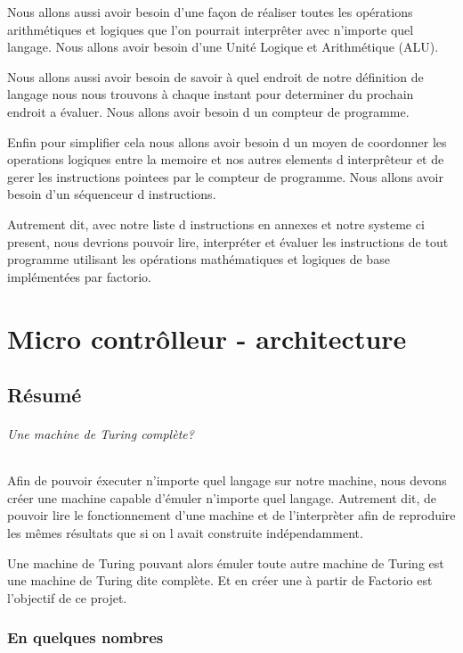 \documentclass{scrreprt}
\begin{document}
	    	Nous allons aussi avoir besoin d'une façon de réaliser toutes les opérations arithmétiques et logiques que l'on pourrait interprêter avec n'importe quel langage. Nous allons avoir besoin d'une Unité Logique et Arithmétique (ALU).
	    
	    	Nous allons aussi avoir besoin de savoir à quel endroit de notre définition de langage nous nous trouvons à chaque instant pour determiner du prochain endroit a évaluer. Nous allons avoir besoin d un compteur de programme.
	    	
	    	Enfin pour simplifier cela nous allons avoir besoin d un moyen de coordonner les operations logiques entre la memoire et nos autres elements d interprêteur et de gerer les instructions pointees par le compteur de programme. Nous allons avoir besoin d'un séquenceur d instructions.
	    	
	    	Autrement dit, avec notre liste d instructions en annexes et notre systeme ci present, nous devrions pouvoir lire, interpréter et évaluer les instructions de tout programme utilisant les opérations mathématiques et logiques de base implémentées par factorio. 
		    
    \part{Micro contrôlleur - architecture}
    \chapter{Résumé}
    	
    	\paragraph{Une machine de Turing complète?}
    	
    	Afin de pouvoir éxecuter n'importe quel langage sur notre machine, nous devons créer une machine capable d'émuler n'importe quel langage. Autrement dit, de pouvoir lire le fonctionnement d'une machine et de l'interprèter afin de reproduire les mêmes résultats que si on l avait construite indépendamment.
    	
    	Une machine de Turing pouvant alors émuler toute autre machine de Turing est une machine de Turing dite complète.
    	Et en créer une à partir de Factorio est l'objectif de ce projet.
    	
    	\section{En quelques nombres}
    	
\end{document}
